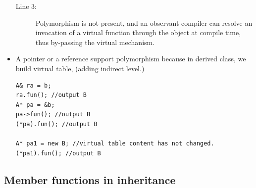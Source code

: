 \documentclass[a4paper,11pt,twoside]{book}
\begin{document}
\begin{itemize}
\begin{description}
	\item[Line 3:] Polymorphism is not present, and an observant compiler can resolve an invocation of a virtual function through the object at compile time, thus by-passing the virtual mechanism.
\end{description}

	\item A pointer or a reference support polymorphism because in derived class, we build virtual table, (adding indirect level.)
\begin{lstlisting}
A& ra = b;
ra.fun(); //output B
A* pa = &b;
pa->fun(); //output B
(*pa).fun(); //output B
		
A* pa1 = new B; //virtual table content has not changed.
(*pa1).fun(); //output B
\end{lstlisting}

\end{itemize}

\subsection{Member functions in inheritance}
\end{document}
